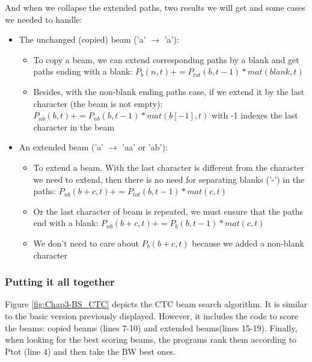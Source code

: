 And when we collapse the extended paths, two results we will get and some cases we needed to handle:
\begin{itemize}
	\item The unchanged (copied) beam ('a' $ \rightarrow $ 'a'):
	      \begin{itemize}
		      \item To copy a beam, we can extend corresponding paths by a blank and get
		            paths ending with a blank: $ P_b (n, t) += P_{tot}(b, t-1)*mat(blank, t) $
		      \item Besides, with the non-blank ending paths case, if we extend it by the last
		            character (the beam is not empty): $ P_{nb}(b,t) += P_{nb}(b,t-1)*mat(b[-1],t) $
		            with -1 indexes the last character in the beam
	      \end{itemize}
	\item An extended beam ('a' $\rightarrow$ 'aa' or 'ab'):
	      \begin{itemize}
		      \item To extend a beam. With the last character is different from the character we need
		            to extend, then there is no need for separating blanks ('-') in the paths:
		            $ P_{nb}(b+c,t) += P_{tot}(b,t-1)*mat(c,t) $
		      \item Or the last character of beam is repeated, we must ensure that the paths
		            end with a blank: $ P_{nb}(b+c,t) += P_b(b,t-1)*mat(c,t) $
		      \item We don't need to care about $P_b(b+c,t)$ because we added a non-blank character
	      \end{itemize}
\end{itemize}

\subsubsection{Putting it all together}

Figure \ref{fig:Chap3-BS_CTC} depicts the CTC beam search algorithm. It is similar to the basic version previously displayed. However, it includes the code to score the beams: copied beams (lines 7-10) and extended beams(lines 15-19). Finally, when looking for the best scoring beams, the programs rank them according to Ptot (line 4) and then take the BW best ones.

